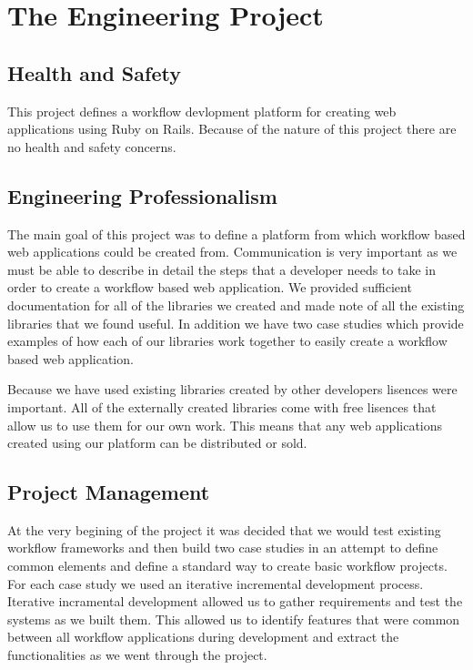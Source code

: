 \documentclass[document.tex]{subfiles}
\begin{document}
\chapter{The Engineering Project}

\section{Health and Safety}

This project defines a workflow devlopment platform for creating web applications using Ruby on Rails. Because of the nature of this project there are no health and safety concerns.

\section{Engineering Professionalism}

The main goal of this project was to define a platform from which workflow based web applications could be created from. Communication is very important as we must be able to describe in detail the steps that a developer needs to take in order to create a workflow based web application. We provided sufficient documentation for all of the libraries we created and made note of all the existing libraries that we found useful. In addition we have two case studies which provide examples of how each of our libraries work together to easily create a workflow based web application.

Because we have used existing libraries created by other developers lisences were important. All of the externally created libraries come with free lisences that allow us to use them for our own work. This means that any web applications created using our platform can be distributed or sold.

\section{Project Management}

At the very begining of the project it was decided that we would test existing workflow frameworks and then build two case studies in an attempt to define common elements and define a standard way to create basic workflow projects. For each case study we used an iterative incremental development process. Iterative incramental development allowed us to gather requirements and test the systems as we built them. This allowed us to identify features that were common between all workflow applications during development and extract the functionalities as we went through the project.
\end{document}
